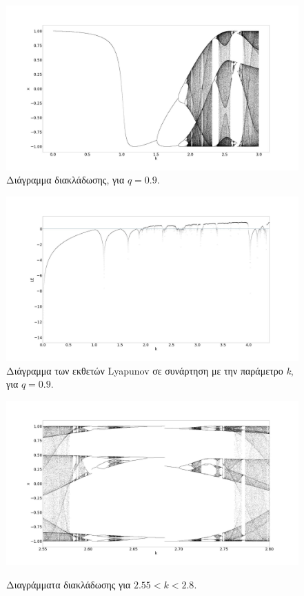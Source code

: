 \begin{table}[ht]
\begin{tabular}{l | l}
	\end{tabular}
	
\end{table}


\begin{figure}[ht]
	\centering
	\includegraphics[width=1\linewidth]{LateX images/cheb q=0.9/g1}
	\caption{Διάγραμμα διακλάδωσης, για $q=0.9$.}
	\label{f:g65}
\end{figure}


\begin{figure}[ht]
	\centering
	\includegraphics[width=1\linewidth]{LateX images/cheb q=0.9/g2}
	\caption{Διάγραμμα των εκθετών Lyapunov σε συνάρτηση με την παράμετρο \emph{k}, για $q=0.9$.}
	\label{f:g66}
\end{figure}


\begin{figure}[ht]
	\centering
	\includegraphics[width=\textwidth]{LateX images/cheb q=0.9/g3}
	\label{f:g67}
	\caption{Διαγράμματα διακλάδωσης για $2.55<k<2.8$. }
\end{figure}

